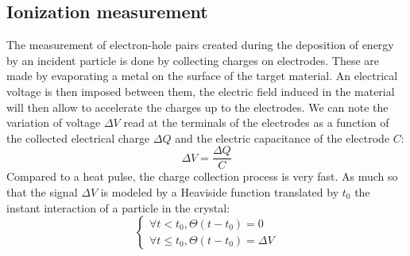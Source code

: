 \subsection{Ionization measurement}

The measurement of electron-hole pairs created during the deposition of energy by an incident particle is done by collecting charges on electrodes. These are made by evaporating a metal on the surface of the target material. An electrical voltage is then imposed between them, the electric field induced in the material will then allow to accelerate the charges up to the electrodes. We can note the variation of voltage $\Delta V$ read at the terminals of the electrodes as a function of the collected electrical charge $\Delta Q$ and the electric capacitance of the electrode $C$: 
\begin{equation}
\Delta V = \frac{\Delta Q}{C}
\end{equation}
Compared to a heat pulse, the charge collection process is very fast. As much so that the signal $\Delta V$ is modeled by a Heaviside function translated by $t_0$ the instant
interaction of a particle in the crystal:
\begin{equation}
\begin{cases}
\forall t < t_0, \Theta(t - t_0 ) = 0 \\
\forall t \leq t_0, \Theta(t - t_0 ) = \Delta V
\end{cases}
\end{equation}





